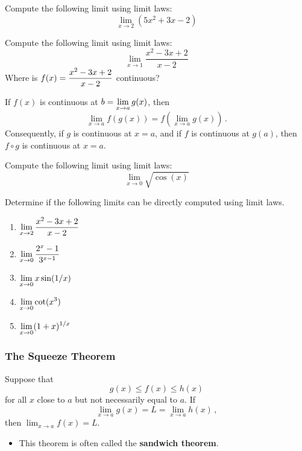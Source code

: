 \documentclass[10pt,t,presentation,ignorenonframetext,aspectratio=169]{beamer}
\begin{document}
\begin{frame}
  \vs
  \question{} Compute the following limit using limit laws:
  \[
    \lim_{x \to 2} (5x^2 + 3x - 2)
  \]
\end{frame}

\begin{frame}
  \vs
  \question{} Compute the following limit using limit laws:
  \[
    \lim_{x\to 1} \frac{x^2-3x+2}{x-2}
  \]
  Where is $\displaystyle f(x) = \frac{x^2 -3x + 2}{x - 2}$ continuous?
  \vfill
\end{frame}

\begin{frame}
  \vs
  \begin{thm}
    If $f(x)$ is continuous at $\displaystyle b = \lim_{x \to a} g(x)$, then
    \[
      \lim_{x \to a} f(g(x)) = f( \lim_{x \to a} g(x) ) \,.
    \]
    Consequently, if $g$ is continuous at $x=a$, and if $f$ is
    continuous at $g(a)$, then $f\circ g$ is continuous at $x=a$.
  \end{thm}
  \vs
  \question{} Compute the following limit using limit laws:
  \[
    \lim_{x \to 0} \sqrt{\cos(x)}
  \]
\end{frame}

\begin{frame}
  \vs
  \question{} Determine if the following limits can be directly
  computed using limit laws.
  \begin{enumerate}
  \item $\displaystyle \lim_{x \to 2} \frac{x^2 - 3x + 2}{x - 2}$ \vfill
  \item $\displaystyle \lim_{x \to 0} \frac{2^x - 1}{3^{x-1}}$ \vfill
  \item $\displaystyle \lim_{x \to 0} x \sin(1/x)$ \vfill
  \item $\displaystyle \lim_{x \to 0} \cot (x^3)$ \vfill
  \item $\displaystyle \lim_{x \to 0} (1 + x)^{1/x}$ \vfill
  \end{enumerate}
\end{frame}

\begin{frame}
  \frametitle{The Squeeze Theorem}
  \begin{thm}
    Suppose that
    \[
      g(x) \le f(x) \le h(x)
    \]
    for all $x$ close to $a$ but not necessarily equal to $a$. If
    \[
      \lim_{x \to a} g(x) = L = \lim_{x \to a} h(x) \,,
    \]
    then $\lim_{x \to a} f(x) = L$.
  \end{thm}
  \begin{itemize}
  \item This theorem is often called the \textbf{sandwich theorem}.
  \end{itemize}
\end{frame}
\end{document}
